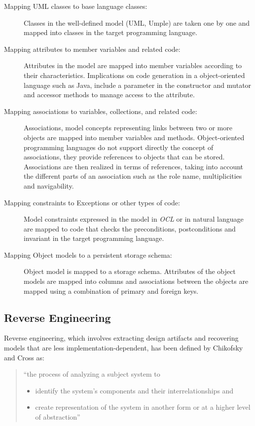 \begin{description}

\item [Mapping UML classes to base language classes:]
Classes in the well-defined model (UML, Umple) are taken one by one and mapped into classes in the target programming language. 

\item [Mapping attributes to member variables and related code:]
Attributes in the model are mapped into member variables according to their characteristics. Implications on code generation in a object-oriented language such as Java, include a parameter in the constructor and mutator and accessor methods to manage access to the attribute.

\item [Mapping associations to variables, collections, and related code:]
Associations, model concepts representing links between two or more objects are mapped into member variables and methods. Object-oriented programming languages do not support directly the concept of associations, they provide references to objects that can be stored. Associations are then realized in terms of references, taking into account the different parts of an association such as the role name, multiplicities and navigability. 

\item [Mapping constraints to Exceptions or other types of code:]
Model constraints expressed in the model in \textit{OCL} or in natural language are mapped to code that checks the preconditions, postconditions and invariant in the target programming language.

\item [Mapping Object models to a persistent storage schema:]
Object model is mapped to a storage schema. Attributes of the object models are mapped into columns and associations between the objects are mapped using a combination of primary and foreign keys. 
\end{description}

\subsection{Reverse Engineering}

Reverse engineering, which involves extracting design artifacts and recovering models that are less implementation-dependent, has been defined by Chikofsky and Cross \cite{Chikofsky} as:

\begin{quote} 
``the process of analyzing a subject system to
\begin{itemize}
\item identify the system's components and their interrelationships and
\item create representation of the system in another form or at a higher level of abstraction''
\end{itemize}
\end{quote}

